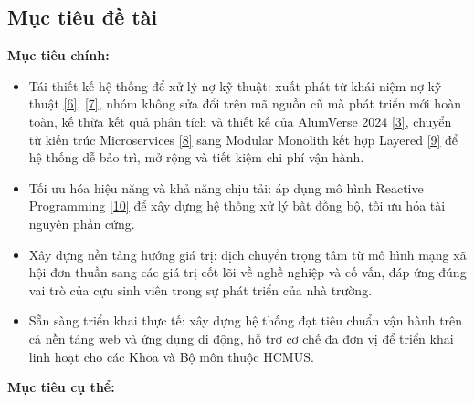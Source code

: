 \documentclass[12pt,a4paper]{article}
\begin{document}
\subsection{Mục tiêu đề tài}
\vspace{-4pt}
\textbf{Mục tiêu chính:}
\vspace{-8pt}
\begin{itemize}
    \item Tái thiết kế hệ thống để xử lý nợ kỹ thuật: xuất phát từ khái niệm nợ kỹ thuật \hyperref[ref:cunningham]{[6]}, \hyperref[ref:fowler]{[7]}, nhóm không sửa đổi trên mã nguồn cũ mà phát triển mới hoàn toàn, kế thừa kết quả phân tích và thiết kế của AlumVerse 2024 \hyperref[ref:alumverse]{[3]}, chuyển từ kiến trúc Microservices \hyperref[ref:microservices]{[8]} sang Modular Monolith kết hợp Layered \hyperref[ref:poeaa]{[9]} để hệ thống dễ bảo trì, mở rộng và tiết kiệm chi phí vận hành.
    \item Tối ưu hóa hiệu năng và khả năng chịu tải: áp dụng mô hình Reactive Programming \hyperref[ref:reactive]{[10]} để xây dựng hệ thống xử lý bất đồng bộ, tối ưu hóa tài nguyên phần cứng.
    \item Xây dựng nền tảng hướng giá trị: dịch chuyển trọng tâm từ mô hình mạng xã hội đơn thuần sang các giá trị cốt lõi về nghề nghiệp và cố vấn, đáp ứng đúng vai trò của cựu sinh viên trong sự phát triển của nhà trường.
    \item Sẵn sàng triển khai thực tế: xây dựng hệ thống đạt tiêu chuẩn vận hành trên cả nền tảng web và ứng dụng di động, hỗ trợ cơ chế đa đơn vị để triển khai linh hoạt cho các Khoa và Bộ môn thuộc HCMUS.
\end{itemize}
\textbf{Mục tiêu cụ thể:}
\vspace{-8pt}
\end{document}
